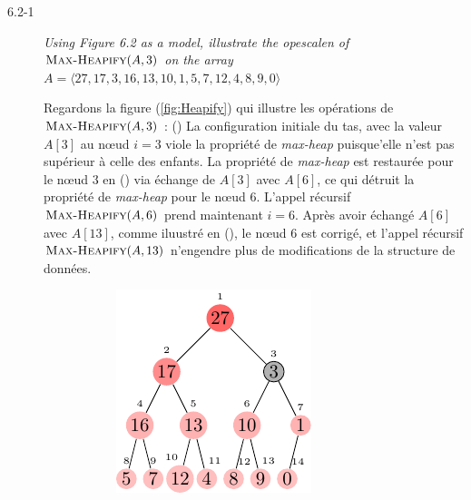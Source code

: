 \begin{description}
  \item[6.2-1] {\itshape Using Figure 6.2 as a model, illustrate the opescalen of $\textsc{Max-Heapify}(A,3)$ on the array $A = \langle 27, 17, 3, 16, 13, 10, 1, 5, 7, 12, 4, 8, 9, 0 \rangle$}
    \begin{ex}

      Regardons la figure (\ref{fig:Heapify}) qui illustre les op\'erations de $\textsc{Max-Heapify}(A,3)$ : () La configuration initiale du tas, avec la valeur $A[3]$ au n\oe ud $i = 3$ viole la propri\'et\'e de \textit{max-heap} puisque'elle n'est pas sup\'erieur \`a celle des enfants. La propri\'et\'e de \textit{max-heap} est restaur\'ee pour le n\oe ud $3$ en () via \'echange de $A[3]$ avec $A[6]$, ce qui d\'etruit la propri\'et\'e de \textit{max-heap} pour le n\oe ud $6$. L'appel r\'ecursif $\textsc{Max-Heapify}(A,6)$ prend maintenant $i=6$. Apr\`es  avoir \'echang\'e $A[6]$ avec $A[13]$, comme iluustr\'e en (), le n\oe ud $6$ est corrig\'e, et l'appel r\'ecursif $\textsc{Max-Heapify}(A,13)$ n'engendre plus de modifications de la structure de donn\'ees.

      \begin{figure}[H]
        \centering
        \begin{subfigure}[t]{.45\textwidth}
          \centering
          \includegraphics[scale=1.4]{img/6_2-1/6_2-1_1}
          \caption{}\label{fig:6_2-1_1}
        \end{subfigure}


\end{figure}
\end{ex}
\end{description}
